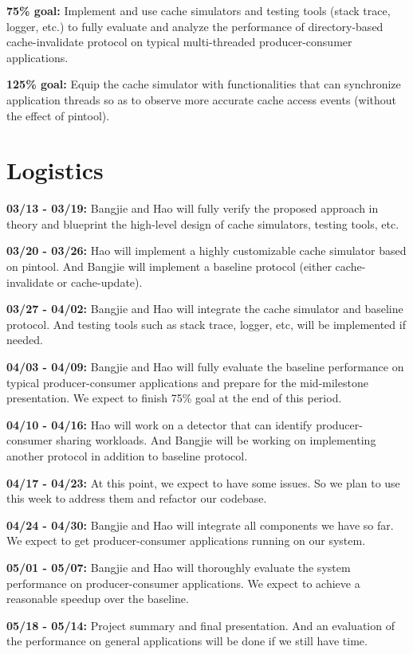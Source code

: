 \documentclass{article} %
\begin{document}
\textbf{75\% goal:} Implement and use cache simulators and testing tools (stack trace, logger, etc.) to fully evaluate and analyze the performance of directory-based cache-invalidate protocol on typical multi-threaded producer-consumer applications.

\textbf{125\% goal:} Equip the cache simulator with functionalities that can synchronize application threads so as to observe more accurate cache access events (without the effect of pintool).


\section{Logistics}

\textbf{03/13 - 03/19:} Bangjie and Hao will fully verify the proposed approach in theory and blueprint the high-level design of cache simulators, testing tools, etc.

\textbf{03/20 - 03/26:} Hao will implement a highly customizable cache simulator based on pintool. And Bangjie will implement a baseline protocol (either cache-invalidate or cache-update).

\textbf{03/27 - 04/02:} Bangjie and Hao will integrate the cache simulator and baseline protocol. And testing tools such as stack trace, logger, etc, will be implemented if needed.

\textbf{04/03 - 04/09:} Bangjie and Hao will fully evaluate the baseline performance on typical producer-consumer applications and prepare for the mid-milestone presentation. We expect to finish 75\% goal at the end of this period.

\textbf{04/10 - 04/16:} Hao will work on a detector that can identify producer-consumer sharing workloads. And Bangjie will be working on implementing another protocol in addition to baseline protocol.

\textbf{04/17 - 04/23:} At this point, we expect to have some issues. So we plan to use this week to address them and refactor our codebase.

\textbf{04/24 - 04/30:} Bangjie and Hao will integrate all components we have so far. We expect to get producer-consumer applications running on our system.

\textbf{05/01 - 05/07:} Bangjie and Hao will thoroughly evaluate the system performance on producer-consumer applications. We expect to achieve a reasonable speedup over the baseline.

\textbf{05/18 - 05/14:} Project summary and final presentation. And an evaluation of the performance on general applications will be done if we still have time.
\end{document}
